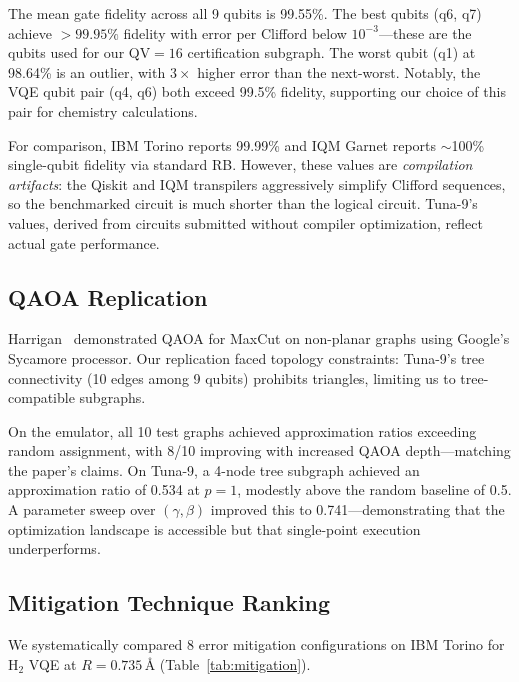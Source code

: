 \documentclass[twocolumn,prl,superscriptaddress,nofootinbib]{revtex4-2}
\begin{document}
The mean gate fidelity across all 9 qubits is 99.55\%.
The best qubits (q6, q7) achieve $> 99.95\%$ fidelity with error per Clifford below $10^{-3}$---these are the qubits used for our QV${}=16$ certification subgraph.
The worst qubit (q1) at 98.64\% is an outlier, with $3\times$ higher error than the next-worst.
Notably, the VQE qubit pair (q4, q6) both exceed 99.5\% fidelity, supporting our choice of this pair for chemistry calculations.

For comparison, IBM Torino reports 99.99\% and IQM Garnet reports $\sim$100\% single-qubit fidelity via standard RB.
However, these values are \emph{compilation artifacts}: the Qiskit and IQM transpilers aggressively simplify Clifford sequences, so the benchmarked circuit is much shorter than the logical circuit.
Tuna-9's values, derived from circuits submitted without compiler optimization, reflect actual gate performance.

\subsection{QAOA Replication}

Harrigan~\cite{harrigan2021} demonstrated QAOA for MaxCut on non-planar graphs using Google's Sycamore processor.
Our replication faced topology constraints: Tuna-9's tree connectivity (10 edges among 9 qubits) prohibits triangles, limiting us to tree-compatible subgraphs.

On the emulator, all 10 test graphs achieved approximation ratios exceeding random assignment, with 8/10 improving with increased QAOA depth---matching the paper's claims.
On Tuna-9, a 4-node tree subgraph achieved an approximation ratio of 0.534 at $p=1$, modestly above the random baseline of 0.5.
A parameter sweep over $(\gamma, \beta)$ improved this to 0.741---demonstrating that the optimization landscape is accessible but that single-point execution underperforms.

\subsection{Mitigation Technique Ranking}

We systematically compared 8 error mitigation configurations on IBM Torino for H$_2$ VQE at $R = 0.735$\,\AA{} (Table~\ref{tab:mitigation}).
\end{document}

